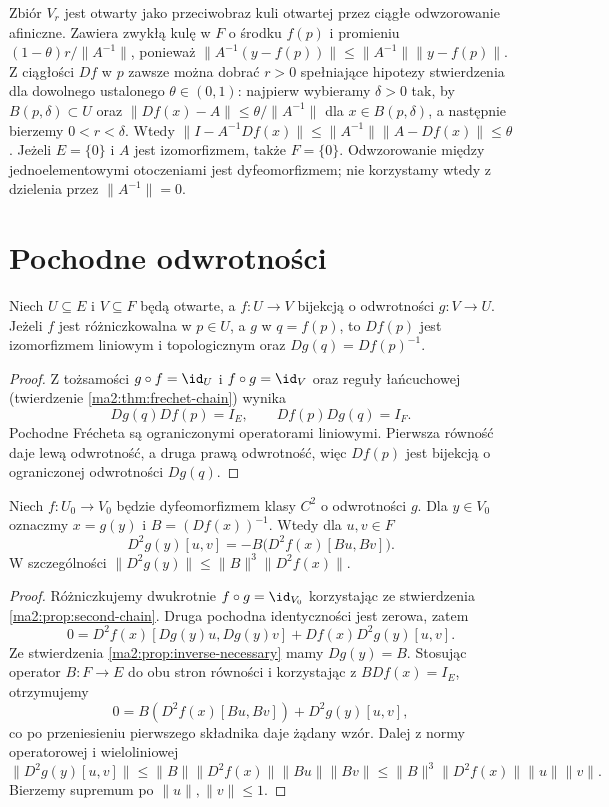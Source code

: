 Zbiór $V_r$ jest otwarty jako przeciwobraz kuli
otwartej przez ciągłe odwzorowanie afiniczne.
Zawiera zwykłą kulę w $F$ o środku $f(p)$ i
promieniu $(1-\theta)r/\|A^{-1}\|$, ponieważ
$\|A^{-1}(y-f(p))\|\le\|A^{-1}\|\|y-f(p)\|$.
Z ciągłości $Df$ w $p$ zawsze można dobrać
$r>0$ spełniające hipotezy stwierdzenia dla dowolnego
ustalonego $\theta\in(0,1)$: najpierw wybieramy
$\delta>0$ tak, by $B(p,\delta)\subset U$ oraz
$\|Df(x)-A\|\le\theta/\|A^{-1}\|$ dla $x\in B(p,\delta)$,
a następnie bierzemy $0<r<\delta$.
Wtedy
$\|I-A^{-1}Df(x)\|\le\|A^{-1}\|\|A-Df(x)\|\le\theta$.
Jeżeli $E=\{0\}$ i $A$ jest izomorfizmem, także $F=\{0\}$.
Odwzorowanie między jednoelementowymi otoczeniami
jest dyfeomorfizmem; nie korzystamy wtedy z dzielenia
przez $\|A^{-1}\|=0$.

\section{Pochodne odwrotności}

\begin{stwierdzenie}
\label{ma2:prop:inverse-necessary}
Niech $U\subseteq E$ i $V\subseteq F$ będą otwarte,
a $f:U\to V$ bijekcją o odwrotności $g:V\to U$.
Jeżeli $f$ jest różniczkowalna w $p\in U$,
a $g$ w $q=f(p)$, to $Df(p)$ jest izomorfizmem
liniowym i topologicznym oraz $Dg(q)=Df(p)^{-1}$.
\end{stwierdzenie}
\begin{proof}
Z tożsamości $g\circ f=\id_U$ i $f\circ g=\id_V$
oraz reguły łańcuchowej
(twierdzenie \ref{ma2:thm:frechet-chain}) wynika
\[
 Dg(q)Df(p)=I_E,\qquad Df(p)Dg(q)=I_F.
\]
Pochodne Frécheta są ograniczonymi operatorami
liniowymi. Pierwsza równość daje lewą odwrotność,
a druga prawą odwrotność, więc $Df(p)$ jest
bijekcją o ograniczonej odwrotności $Dg(q)$.
\end{proof}

\begin{stwierdzenie}
\label{ma2:prop:inverse-second-derivative}
Niech $f:U_0\to V_0$ będzie dyfeomorfizmem klasy
$C^2$ o odwrotności $g$. Dla $y\in V_0$ oznaczmy
$x=g(y)$ i $B=(Df(x))^{-1}$. Wtedy dla $u,v\in F$
\[
 D^2g(y)[u,v]=-B\bigl(D^2f(x)[Bu,Bv]\bigr).
\]
W szczególności
$\|D^2g(y)\|\le\|B\|^3\|D^2f(x)\|$.
\end{stwierdzenie}
\begin{proof}
Różniczkujemy dwukrotnie $f\circ g=\id_{V_0}$
korzystając ze stwierdzenia \ref{ma2:prop:second-chain}.
Druga pochodna identyczności jest zerowa, zatem
\[
 0=D^2f(x)[Dg(y)u,Dg(y)v]
           +Df(x)D^2g(y)[u,v].
\]
Ze stwierdzenia \ref{ma2:prop:inverse-necessary}
mamy $Dg(y)=B$. Stosując operator $B:F\to E$ do obu stron
równości i korzystając z $BDf(x)=I_E$, otrzymujemy
\[
 0=B(D^2f(x)[Bu,Bv])+D^2g(y)[u,v],
\]
co po przeniesieniu pierwszego składnika daje żądany wzór.
Dalej z normy operatorowej i wieloliniowej
\[
 \|D^2g(y)[u,v]\|
 \le\|B\|\|D^2f(x)\|\|Bu\|\|Bv\|
 \le\|B\|^3\|D^2f(x)\|\|u\|\|v\|.
\]
Bierzemy supremum po $\|u\|,\|v\|\le1$.
\end{proof}

